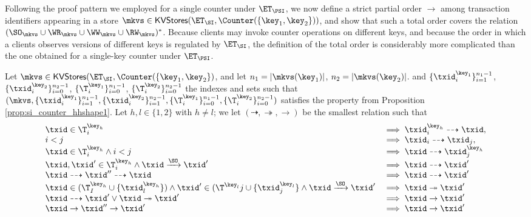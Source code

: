 Following the proof pattern we employed for a single counter under $\ET_{\PSI}$, we now 
define a strict partial order $\rightarrow$ among transaction identifiers appearing in a store 
$\mkvs \in \mathsf{KVStores}(\ET_{\SI},  \Counter(\{\key_1, \key_2\}))$, and show that such a 
total order covers the relation $(\SO_{\mkvs} \cup \WR_{\mkvs} \cup \WW_{\mkvs} \cup \RW_{\mkvs})^{\ast}$. 
Because clients may invoke counter operations on different keys, and because the 
order in which a clients observes versions of different keys is regulated by $\ET_{\SI}$, 
the definition of the total order is considerably more complicated than the one 
obtained for a single-key counter under $\ET_\PSI$.

\begin{definition}
\label{def:si_counter_order}
Let $\mkvs \in \mathsf{KVStores}(\ET_{\SI}, \Counter(\{\key_1, \key_2\})$, and let 
$n_1 = \lvert \mkvs(\key_1) \rvert$, $n_2 = \lvert \mkvs(\key_2) \rvert$. 
and $\{\txid_{i}^{\key_1}\}_{i=1}^{n_1 - 1}$, $\{\txid_{i}^{\key_2}\}_{i=0}^{n_2 - 1}$, 
$\{\T_{i}^{\key_1}\}_{i=0}^{n_1-1}$, $\{\T_{i}^{\key_2}\}_{i=0}^{n_2 - 1}$ the indexes 
and sets such that $(\mkvs, \{\txid_{i}^{\key_{1}}\}_{i=1}^{n_1 - 1}, \{\txid^{\key_2}_{i}\}_{i=1}^{n_2 - 1}, 
\{\T_{i}^{\key_1}\}_{i=0}^{n_1 - 1}, \{\T_{i}^{\key_2}\}_{i=0}^{n_2-1})$ satisfies the property from 
Proposition \ref{prop:si_counter_hhshape1}. Let $h, l \in \{1,2\}$ with $h \neq l$; we 
let $(\dashrightarrow, \twoheadrightarrow, \rightarrow)$ be the smallest relation such that 
\[
\begin{array}{ll}
\txid \in \T^{\key_{h}}_{i} &\implies \txid^{\key_{h}}_{i} \dashrightarrow \txid,\\
i < j &\implies \txid_{i} \dashrightarrow \txid_{j},\\
\txid \in \T^{\key_{h}}_{i} \wedge i < j & \implies \txid \dashrightarrow \txid^{\key_{h}}_{j}\\
\txid, \txid' \in \T^{\key_{h}}_{i} \wedge \txid \xrightarrow{\SO} \txid' &\implies \txid \dashrightarrow \txid'\\
\txid \dashrightarrow \txid'' \dashrightarrow \txid &\implies \txid \dashrightarrow \txid'\\
\txid \in (\T^{\key_{h}}_{I} \cup \{\txid^{\key_{h}}_{l}\}) \wedge \txid' \in (\T^{\key_{l}}{j} \cup \{\txid^{\key_l}_{j}\} \wedge \txid \xrightarrow{\SO} \txid' &\implies \txid \twoheadrightarrow \txid'\\
\txid \dashrightarrow \txid' \vee \txid \twoheadrightarrow \txid' &\implies \txid \rightarrow \txid'\\
\txid \rightarrow \txid'' \rightarrow \txid' &\implies \txid \rightarrow \txid'
\end{array}
\]
%
\end{definition}
